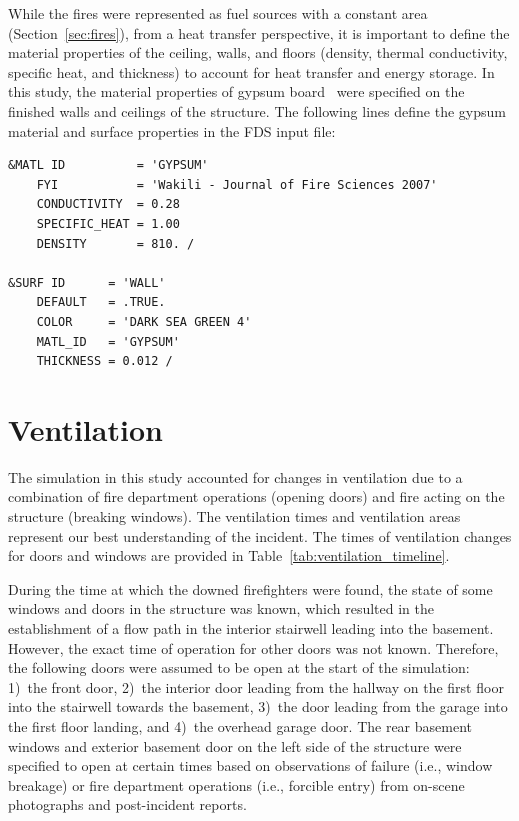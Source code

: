 \documentclass[12pt,oneside]{book}
\begin{document}
While the fires were represented as fuel sources with a constant area (Section~\ref{sec:fires}), from a heat transfer perspective, it is important to define the material properties of the ceiling, walls, and floors (density, thermal conductivity, specific heat, and thickness) to account for heat transfer and energy storage. In this study, the material properties of gypsum board~\cite{WAKILI2007} were specified on the finished walls and ceilings of the structure. The following lines define the gypsum material and surface properties in the FDS input file:

\begin{lstlisting}
&MATL ID          = 'GYPSUM'
    FYI           = 'Wakili - Journal of Fire Sciences 2007' 
    CONDUCTIVITY  = 0.28
    SPECIFIC_HEAT = 1.00
    DENSITY       = 810. /

&SURF ID      = 'WALL'
    DEFAULT   = .TRUE.
    COLOR     = 'DARK SEA GREEN 4'
    MATL_ID   = 'GYPSUM'
    THICKNESS = 0.012 /
\end{lstlisting}

\section{Ventilation}
\label{sec:ventilation}

The simulation in this study accounted for changes in ventilation due to a combination of fire department operations (opening doors) and fire acting on the structure (breaking windows). The ventilation times and ventilation areas represent our best understanding of the incident. The times of ventilation changes for doors and windows are provided in Table~\ref{tab:ventilation_timeline}.

During the time at which the downed firefighters were found, the state of some windows and doors in the structure was known, which resulted in the establishment of a flow path in the interior stairwell leading into the basement. However, the exact time of operation for other doors was not known. Therefore, the following doors were assumed to be open at the start of the simulation: 1)~the front door, 2)~the interior door leading from the hallway on the first floor into the stairwell towards the basement, 3)~the door leading from the garage into the first floor landing, and 4)~the overhead garage door. The rear basement windows and exterior basement door on the left side of the structure were specified to open at certain times based on observations of failure (i.e., window breakage) or fire department operations (i.e., forcible entry) from on-scene photographs and post-incident reports.
\end{document}
